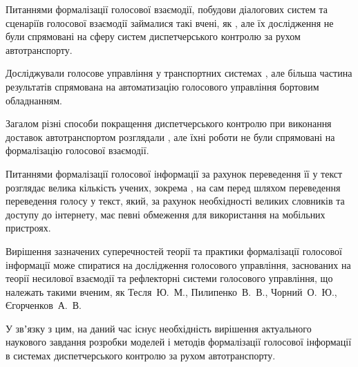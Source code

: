 \begin{refsection}
Питаннями формалізації голосової взаємодії, побудови діалогових систем та сценаріїв голосової взаємодії займалися такі вчені, як , але їх дослідження не були спрямовані на сферу систем диспетчерського контролю за рухом автотранспорту. 

Досліджували голосове управління у транспортних системах , але більша частина результатів спрямована на автоматизацію голосового управління бортовим обладнанням.

Загалом різні способи покращення диспетчерського контролю при виконання доставок автотранспортом розглядали , але їхні роботи не були спрямовані на формалізацію голосової взаємодії.

Питаннями формалізації голосової інформації за рахунок переведення її у текст розглядає велика кількість учених, зокрема , на сам перед шляхом переведення переведення голосу у текст, який, за рахунок необхідності великих словників та доступу до інтернету, має певні обмеження для використання на мобільних пристроях.

Вирішення зазначених суперечностей теорії та практики формалізації голосової інформації може спиратися на дослідження голосового управління, заснованих на теорії несилової взаємодії та рефлекторні системи голосового управління, що належать такими вченим, як Тесля~Ю.~М., Пилипенко~В.~В., Чорний~О.~Ю., Єгорченков~А.~В.
\end{refsection}

У звʼязку з цим, на даний час існує необхідність вирішення актуального наукового завдання розробки моделей і методів формалізації голосової інформації в системах диспетчерського контролю за рухом автотранспорту.



